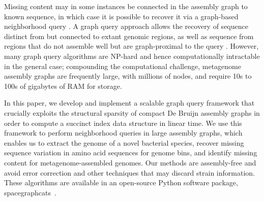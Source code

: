 Missing content may in some instances be connected in the assembly
graph to known sequence, in which case it is possible to recover it
via a graph-based neighborhood query \cite{metacherchant,perchlorate}.  A graph query approach allows the recovery of sequence distinct from but connected to extant
genomic regions, as well as sequence from regions that do not assemble
well but are graph-proximal to the query \cite{metacherchant}.  However, many graph query
algorithms are NP-hard and hence computationally intractable in the
general case; compounding the computational challenge, metagenome assembly
graphs are frequently large, with millions of nodes, and require 10s
to 100s of gigabytes of RAM for storage.

In this paper, we develop and implement a scalable graph query
framework that crucially exploits the structural sparsity of compact De Bruijn
assembly graphs in order to compute a succinct index data structure in linear
time. We use this framework to perform neighborhood
queries in large assembly graphs, which enables us to extract the
genome of a novel bacterial species, recover missing sequence
variation in amino acid sequences for genome bins, and identify
missing content for metagenome-assembled genomes.  Our methods
are assembly-free and avoid error correction and other techniques that
may discard strain information.  These algorithms are available in an
open-source Python software package,
\textsf{spacegraphcats}~\cite{spacegraphcats}.

